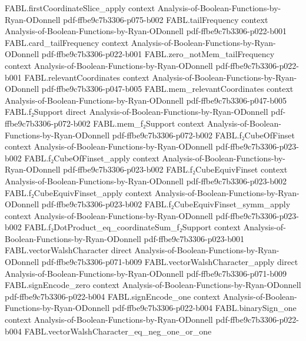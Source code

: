 \begin{theorem}
\proofstep
  {FABL.firstCoordinateSlice_apply}
  {context}
  {Analysis-of-Boolean-Functions-by-Ryan-ODonnell}
  {pdf-ffbe9c7b3306-p075-b002}
\proofstep
  {FABL.tailFrequency}
  {context}
  {Analysis-of-Boolean-Functions-by-Ryan-ODonnell}
  {pdf-ffbe9c7b3306-p022-b001}
\proofstep
  {FABL.card_tailFrequency}
  {context}
  {Analysis-of-Boolean-Functions-by-Ryan-ODonnell}
  {pdf-ffbe9c7b3306-p022-b001}
\proofstep
  {FABL.zero_notMem_tailFrequency}
  {context}
  {Analysis-of-Boolean-Functions-by-Ryan-ODonnell}
  {pdf-ffbe9c7b3306-p022-b001}
\proofstep
  {FABL.relevantCoordinates}
  {context}
  {Analysis-of-Boolean-Functions-by-Ryan-ODonnell}
  {pdf-ffbe9c7b3306-p047-b005}
\proofstep
  {FABL.mem_relevantCoordinates}
  {context}
  {Analysis-of-Boolean-Functions-by-Ryan-ODonnell}
  {pdf-ffbe9c7b3306-p047-b005}
\proofstep
  {FABL.f₂Support}
  {direct}
  {Analysis-of-Boolean-Functions-by-Ryan-ODonnell}
  {pdf-ffbe9c7b3306-p072-b002}
\proofstep
  {FABL.mem_f₂Support}
  {context}
  {Analysis-of-Boolean-Functions-by-Ryan-ODonnell}
  {pdf-ffbe9c7b3306-p072-b002}
\proofstep
  {FABL.f₂CubeOfFinset}
  {context}
  {Analysis-of-Boolean-Functions-by-Ryan-ODonnell}
  {pdf-ffbe9c7b3306-p023-b002}
\proofstep
  {FABL.f₂CubeOfFinset_apply}
  {context}
  {Analysis-of-Boolean-Functions-by-Ryan-ODonnell}
  {pdf-ffbe9c7b3306-p023-b002}
\proofstep
  {FABL.f₂CubeEquivFinset}
  {context}
  {Analysis-of-Boolean-Functions-by-Ryan-ODonnell}
  {pdf-ffbe9c7b3306-p023-b002}
\proofstep
  {FABL.f₂CubeEquivFinset_apply}
  {context}
  {Analysis-of-Boolean-Functions-by-Ryan-ODonnell}
  {pdf-ffbe9c7b3306-p023-b002}
\proofstep
  {FABL.f₂CubeEquivFinset_symm_apply}
  {context}
  {Analysis-of-Boolean-Functions-by-Ryan-ODonnell}
  {pdf-ffbe9c7b3306-p023-b002}
\proofstep
  {FABL.f₂DotProduct_eq_coordinateSum_f₂Support}
  {context}
  {Analysis-of-Boolean-Functions-by-Ryan-ODonnell}
  {pdf-ffbe9c7b3306-p023-b001}
\proofstep
  {FABL.vectorWalshCharacter}
  {direct}
  {Analysis-of-Boolean-Functions-by-Ryan-ODonnell}
  {pdf-ffbe9c7b3306-p071-b009}
\proofstep
  {FABL.vectorWalshCharacter_apply}
  {direct}
  {Analysis-of-Boolean-Functions-by-Ryan-ODonnell}
  {pdf-ffbe9c7b3306-p071-b009}
\proofstep
  {FABL.signEncode_zero}
  {context}
  {Analysis-of-Boolean-Functions-by-Ryan-ODonnell}
  {pdf-ffbe9c7b3306-p022-b004}
\proofstep
  {FABL.signEncode_one}
  {context}
  {Analysis-of-Boolean-Functions-by-Ryan-ODonnell}
  {pdf-ffbe9c7b3306-p022-b004}
\proofstep
  {FABL.binarySign_one}
  {context}
  {Analysis-of-Boolean-Functions-by-Ryan-ODonnell}
  {pdf-ffbe9c7b3306-p022-b004}
\proofstep
  {FABL.vectorWalshCharacter_eq_neg_one_or_one}

\end{theorem}

